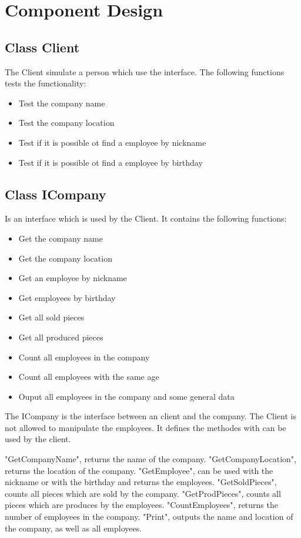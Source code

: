\section{Component Design}
\subsection{Class Client}
The Client simulate a person which use the interface.
The following functions tests the functionality:
\begin{itemize}
	\item Test the company name
	\item Test the company location
	\item Test if it is possible ot find a employee by nickname
	\item Test if it is possible ot find a employee by birthday
\end{itemize}

\subsection{Class ICompany}
Is an interface which is used by the Client.
It contains the following functions:
\begin{itemize}
	\item Get the company name
	\item Get the company location
	\item Get an employee by nickname
	\item Get employees by birthday
	\item Get all sold pieces
	\item Get all produced pieces
	\item Count all employees in the company
	\item Count all employees with the same age
	\item Ouput all employees in the company and some general data
\end{itemize}

The ICompany is the interface between an client and the company. The Client is not allowed to manipulate the employees.
It defines the methodes with can be used by the client.

"GetCompanyName", returns the name of the company.
"GetCompanyLocation", returns the location of the company.
"GetEmployee", can be used with the nickname or with the birthday and returns the employees.
"GetSoldPieces", counts all pieces which are sold by the company.
"GetProdPieces", counts all pieces which are produces by the employees.
"CountEmployees", returns the number of employees in the company.
"Print", outputs the name and location of the company, as well as all employees.

